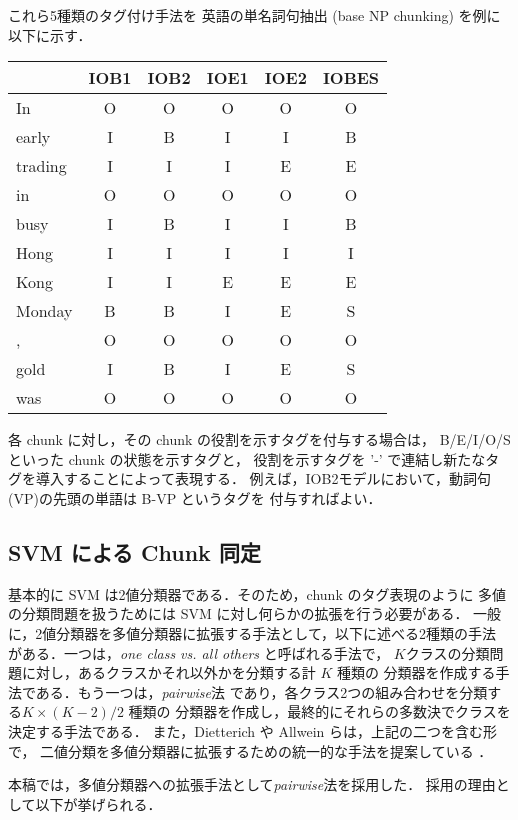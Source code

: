 これら5種類のタグ付け手法を 英語の単名詞句抽出 (base NP chunking) を例に以下に示す．

\begin{center}
\begin{tabular}{l|ccccc}
            &  IOB1 & IOB2 & IOE1 &  IOE2 &  IOBES \\
\hline
In          & O & O & O & O & O \\
early       & I & B & I & I & B \\
trading     & I & I & I & E & E \\
in          & O & O & O & O & O \\
busy        & I & B & I & I & B \\
Hong        & I & I & I & I & I \\
Kong        & I & I & E & E & E \\
Monday      & B & B & I & E & S \\
,           & O & O & O & O & O \\
gold        & I & B & I & E & S \\
was         & O & O & O & O & O \\
\end{tabular}
\end{center}

各 chunk に対し，その chunk の役割を示すタグを付与する場合は，
B/E/I/O/S といった chunk の状態を示すタグと，
役割を示すタグを '-' で連結し新たなタグを導入することによって表現する．
例えば，IOB2モデルにおいて，動詞句(VP)の先頭の単語は B-VP というタグを
付与すればよい．

\subsection{SVM による Chunk 同定}
基本的に SVM は2値分類器である．そのため，chunk のタグ表現のように
多値の分類問題を扱うためには SVM に対し何らかの拡張を行う必要がある．
一般に，2値分類器を多値分類器に拡張する手法として，以下に述べる2種類の手法
がある．一つは，{\it one class vs. all others} と呼ばれる手法で，
$K$クラスの分類問題に対し，あるクラスかそれ以外かを分類する計 $K$ 種類の
分類器を作成する手法である．もう一つは，{\it pairwise}法
であり，各クラス2つの組み合わせを分類する$K\times(K-2)/2$ 種類の
分類器を作成し，最終的にそれらの多数決でクラスを決定する手法である．
また，Dietterich や Allwein らは，上記の二つを含む形で，
二値分類を多値分類器に拡張するための統一的な手法を提案している
\cite{dietterich95solving,allwein00reducing}．

本稿では，多値分類器への拡張手法として{\it pairwise}法を採用した．
採用の理由として以下が挙げられる．

